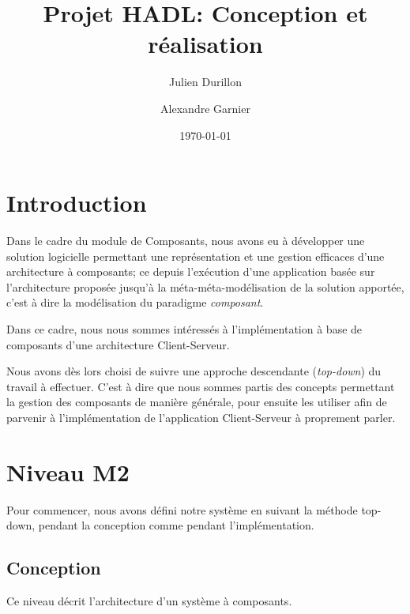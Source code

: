\documentclass[french,a4paper,titlepage]{article}
\title{Projet HADL: Conception et réalisation}
\author{Julien Durillon \and Alexandre Garnier}
\date{\today}
\begin{document}
	\maketitle

	\tableofcontents\clearpage
	
	\section*{Introduction}

	  Dans le cadre du module de Composants, nous avons eu à développer une
	  solution logicielle permettant une représentation et une gestion efficaces
	  d'une architecture à composants; ce depuis l'exécution d'une application
	  basée sur l'architecture proposée jusqu'à la méta-méta-modélisation de la
	  solution apportée, c'est à dire la modélisation du paradigme
	  \emph{composant}.

    Dans ce cadre, nous nous sommes intéressés à l'implémentation à base de
    composants d'une architecture Client-Serveur.
    
    Nous avons dès lors choisi de suivre une approche descendante
    (\emph{top-down}) du travail à effectuer. C'est à dire que nous sommes
    partis des concepts permettant la gestion des composants de manière
    générale, pour ensuite les utiliser afin de parvenir à l'implémentation de
    l'application Client-Serveur à proprement parler.

	\section{Niveau M2}
	
		Pour commencer, nous avons défini notre système en suivant la méthode
		top-down, pendant la conception comme pendant l'implémentation.
	
		\subsection{Conception}
		\normalfont
			Ce niveau décrit l'architecture d'un système à composants.
		
\end{document}
